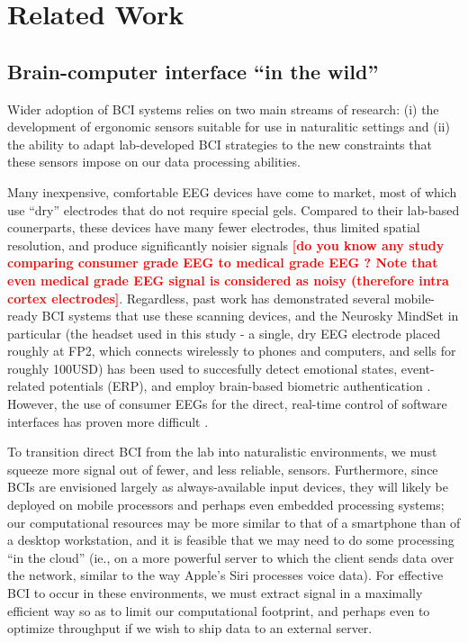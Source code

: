 
\section{Related Work}
\subsection{Brain-computer interface ``in the wild''}

Wider adoption of BCI systems relies on two main streams of research: (i) the development of ergonomic sensors suitable for use in naturalitic settings and (ii) the ability to adapt lab-developed BCI strategies to the new constraints that these sensors impose on our data processing abilities. 

Many inexpensive, comfortable EEG devices have come to market, most of which use ``dry'' electrodes that do not require special gels. Compared to their lab-based counerparts, these devices have many fewer electrodes, thus limited spatial resolution, and produce significantly noisier signals \textcolor{red}{\bf [do you know any study comparing consumer grade EEG to medical grade EEG ? Note that even medical grade EEG signal is considered as noisy (therefore intra cortex electrodes]}. Regardless, past work has demonstrated several mobile-ready BCI systems that use these scanning devices, and the Neurosky MindSet in particular (the headset used in this study - a single, dry EEG electrode placed roughly at FP2, which connects wirelessly to phones and computers, and sells for roughly 100USD) has been used to succesfully detect emotional states, event-related potentials (ERP), and employ brain-based biometric authentication \cite{crowley_evaluating_2010,grierson_better_2011,adams_i_2013}.  However, the use of consumer EEGs for the direct, real-time control of software interfaces has proven more difficult \cite{carrino_self-paced_2012,larsen_classification_2011}. 

To transition direct BCI from the lab into naturalistic environments, we must squeeze more signal out of fewer, and less reliable, sensors. Furthermore, since BCIs are envisioned largely as always-available input devices, they will likely be deployed on mobile processors and perhaps even embedded processing systems; our computational resources may be more similar to that of a smartphone than of a desktop workstation, and it is feasible that we may need to do some processing ``in the cloud'' (ie., on a more powerful server to which the client sends data over the network, similar to the way Apple's Siri processes voice data). For effective BCI to occur in these environments, we must extract signal in a maximally efficient way so as to limit our computational footprint, and perhaps even to optimize throughput if we wish to ship data to an external server.

